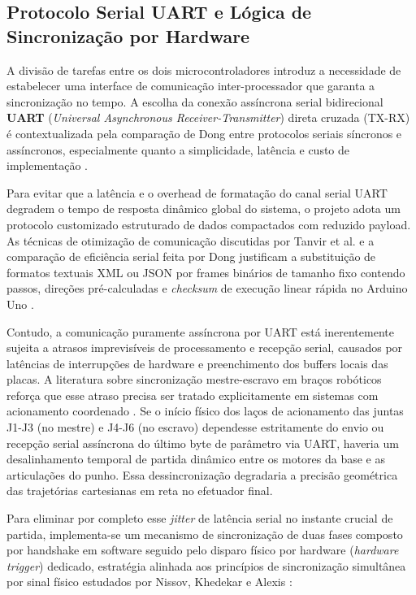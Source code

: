 \subsection{Protocolo Serial UART e Lógica de Sincronização por Hardware}
\label{subsec:sincronizacao_hardware}

A divisão de tarefas entre os dois microcontroladores introduz a necessidade de estabelecer uma interface de comunicação inter-processador que garanta a sincronização no tempo. A escolha da conexão assíncrona serial bidirecional \textbf{UART} (\textit{Universal Asynchronous Receiver-Transmitter}) direta cruzada (TX-RX) é contextualizada pela comparação de Dong entre protocolos seriais síncronos e assíncronos, especialmente quanto a simplicidade, latência e custo de implementação \cite{dong2022comparative}.

Para evitar que a latência e o overhead de formatação do canal serial UART degradem o tempo de resposta dinâmico global do sistema, o projeto adota um protocolo customizado estruturado de dados compactados com reduzido payload. As técnicas de otimização de comunicação discutidas por Tanvir et al. e a comparação de eficiência serial feita por Dong justificam a substituição de formatos textuais XML ou JSON por frames binários de tamanho fixo contendo passos, direções pré-calculadas e \textit{checksum} de execução linear rápida no Arduino Uno \cite{tanvir2024optimizing, dong2022comparative}.

Contudo, a comunicação puramente assíncrona por UART está inerentemente sujeita a atrasos imprevisíveis de processamento e recepção serial, causados por latências de interrupções de hardware e preenchimento dos buffers locais das placas. A literatura sobre sincronização mestre-escravo em braços robóticos reforça que esse atraso precisa ser tratado explicitamente em sistemas com acionamento coordenado \cite{htun2023master}. Se o início físico dos laços de acionamento das juntas J1-J3 (no mestre) e J4-J6 (no escravo) dependesse estritamente do envio ou recepção serial assíncrona do último byte de parâmetro via UART, haveria um desalinhamento temporal de partida dinâmico entre os motores da base e as articulações do punho. Essa dessincronização degradaria a precisão geométrica das trajetórias cartesianas em reta no efetuador final.

Para eliminar por completo esse \textit{jitter} de latência serial no instante crucial de partida, implementa-se um mecanismo de sincronização de duas fases composto por handshake em software seguido pelo disparo físico por hardware (\textit{hardware trigger}) dedicado, estratégia alinhada aos princípios de sincronização simultânea por sinal físico estudados por Nissov, Khedekar e Alexis \cite{nissov2025simultaneous}:

